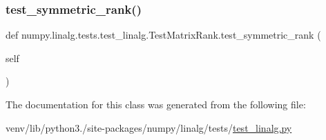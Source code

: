 \mbox{\label{classnumpy_1_1linalg_1_1tests_1_1test__linalg_1_1TestMatrixRank_a42ee8d301a4e26e0ba8ab6a74862b15d}} 
\subsubsection{\texorpdfstring{test\+\_\+symmetric\+\_\+rank()}{test\_symmetric\_rank()}}
{\footnotesize\ttfamily def numpy.\+linalg.\+tests.\+test\+\_\+linalg.\+Test\+Matrix\+Rank.\+test\+\_\+symmetric\+\_\+rank (\begin{DoxyParamCaption}\item[{}]{self }\end{DoxyParamCaption})}



The documentation for this class was generated from the following file\+:\begin{DoxyCompactItemize}
\item 
venv/lib/python3./site-\/packages/numpy/linalg/tests/\hyperlink{test__linalg_8py}{test\+\_\+linalg.\+py}\end{DoxyCompactItemize}
